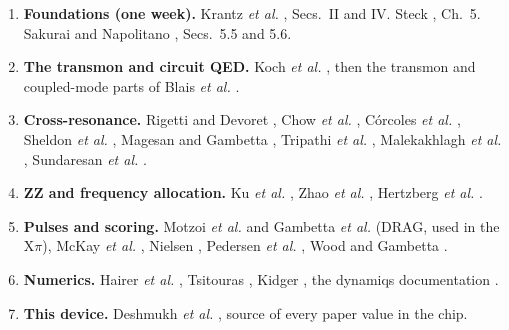 \documentclass[11pt,a4paper]{article}
\begin{document}
\begin{enumerate}
\item \textbf{Foundations (one week).} Krantz \emph{et al.} \cite{krantz2019}, Secs.~II and IV. Steck \cite{steck}, Ch.~5.
  Sakurai and Napolitano \cite{sakurai}, Secs.~5.5 and 5.6.
\item \textbf{The transmon and circuit QED.} Koch \emph{et al.} \cite{koch2007}, then the transmon and coupled-mode parts of
  Blais \emph{et al.} \cite{blais2021}.
\item \textbf{Cross-resonance.} Rigetti and Devoret \cite{rigetti2010}, Chow \emph{et al.} \cite{chow2011}, C\'orcoles
  \emph{et al.} \cite{corcoles2013}, Sheldon \emph{et al.} \cite{sheldon2016}, Magesan and Gambetta \cite{magesan2020},
  Tripathi \emph{et al.} \cite{tripathi2019}, Malekakhlagh \emph{et al.} \cite{malekakhlagh2020}, Sundaresan \emph{et al.}
  \cite{sundaresan2020}.
\item \textbf{ZZ and frequency allocation.} Ku \emph{et al.} \cite{ku2020}, Zhao \emph{et al.} \cite{zhao2020},
  Hertzberg \emph{et al.} \cite{hertzberg2021}.
\item \textbf{Pulses and scoring.} Motzoi \emph{et al.} \cite{motzoi2009} and Gambetta \emph{et al.} \cite{gambetta2011}
  (DRAG, used in the X\(\pi\)), McKay \emph{et al.} \cite{mckay2017}, Nielsen \cite{nielsen2002}, Pedersen \emph{et al.}
  \cite{pedersen2007}, Wood and Gambetta \cite{wood2018}.
\item \textbf{Numerics.} Hairer \emph{et al.} \cite{hairer1993}, Tsitouras \cite{tsitouras2011}, Kidger \cite{kidger2021},
  the dynamiqs documentation \cite{dynamiqs}.
\item \textbf{This device.} Deshmukh \emph{et al.} \cite{deshmukh2026}, source of every paper value in the chip.
\end{enumerate}
\end{document}
